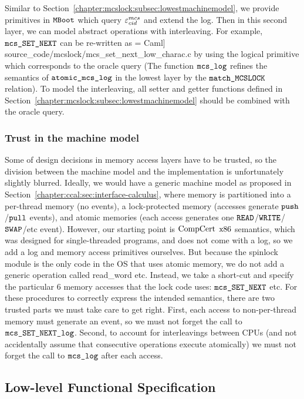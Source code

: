 Similar to Section~\ref{chapter:mcslock:subsec:lowestmachinemodel}, 
we provide primitives in ${\mathrm{\texttt{MBoot}}}$ which query ${\varepsilon}^{mcs}_{cid}$ and extend the log.
Then in this second layer, we can model abstract operations with interleaving.
For example, ${\mathrm{\texttt{mcs\_SET\_NEXT}}}$ can be re-written as
 = Caml] {source_code/mcslock/mcs_set_next_low_charac.c}
by using the logical primitive which corresponds to the oracle query
(The function ${\mathrm{\texttt{mcs\_log}}}$ refines the semantics of ${\mathrm{\texttt{atomic\_mcs\_log}}}$ in the lowest layer by the ${\mathrm{\texttt{match\_MCSLOCK}}}$ relation).
To model the interleaving, all  setter and getter functions defined
in Section~\ref{chapter:mcslock:subsec:lowestmachinemodel} should be combined with the
oracle query.

\subsubsection{Trust in the machine model}
Some of design decisions in  memory access
layers have to be trusted, so the division between the machine model and
the implementation is unfortunately slightly blurred.
Ideally, we would have a generic machine model as proposed in Section~\ref{chapter:ccal:sec:interface-calculus}, where memory is partitioned into a per-thread 
memory (no events), a lock-protected memory (accesses generate ${\mathrm{\texttt{push}}}$/${\mathrm{\texttt{pull}}}$
events), and atomic memories (each access
generates one ${\mathrm{\texttt{READ}}}$/${\mathrm{\texttt{WRITE}}}$/${\mathrm{\texttt{SWAP}}}$/etc event).  However, our starting point
is  $\mathrm{CompCert}$ $\mathrm{x86}$ semantics, which was designed for single-threaded
programs, and does not come with a log, so we add a log and memory access
primitives ourselves.
But because the spinlock module is the only code in the OS that uses
atomic memory, we do not add a generic operation called
read\_word etc. Instead, we take a short-cut and specify the particular
6 memory accesses that the lock code uses: ${\mathrm{\texttt{mcs\_SET\_NEXT}}}$ etc.
For these procedures to correctly express the intended semantics,
there are two trusted parts we must take care to get right. First,
each access to non-per-thread  memory must generate an event, so we
must not forget the call to
${\mathrm{\texttt{mcs\_SET\_NEXT\_log}}}$.
Second, to account for
interleavings between CPUs (and not accidentally assume that consecutive
operations execute atomically) we must not forget the call to
${\mathrm{\texttt{mcs\_log}}}$ after each access.



\subsection{Low-level Functional Specification}
\label{chapter:mcslock:subsec:atomicoperation}

